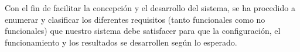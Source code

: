 Con el fin de facilitar la concepción y el desarrollo del sistema, se ha procedido a enumerar y clasificar los diferentes requisitos (tanto funcionales como no funcionales) que nuestro sistema debe satisfacer para que la configuración, el funcionamiento y los resultados se desarrollen según lo esperado.

